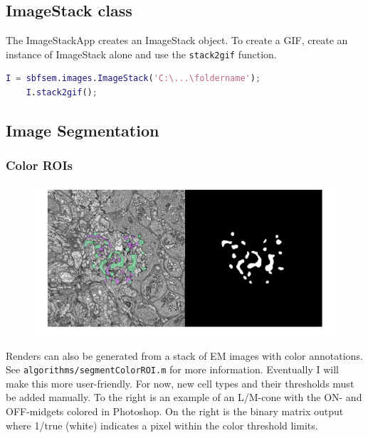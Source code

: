 \documentclass[12pt]{exam}
\begin{document}
	\subsection{ImageStack class}
	The ImageStackApp creates an ImageStack object. To create a GIF, create an instance of ImageStack alone and use the \texttt{stack2gif} function. 
	\begin{lstlisting}[language=matlab]
	I = sbfsem.images.ImageStack('C:\...\foldername');
	I.stack2gif();\end{lstlisting}
	\subsection{Image Segmentation}
	\subsubsection{Color ROIs}
	\begin{figure}
		\includegraphics[width=\linewidth]{colorROI}
		\label{colorROI}
	\end{figure}
	Renders can also be generated from a stack of EM images with color annotations. See \texttt{algorithms/segmentColorROI.m} for more information. Eventually I will make this more user-friendly. For now, new cell types and their thresholds must be added manually. To the right is an example of an L/M-cone with the ON- and OFF-midgets colored in Photoshop. On the right is the binary matrix output where 1/true (white) indicates a pixel within the color threshold limits.
\end{document}
